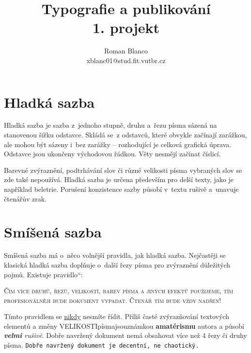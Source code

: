 \documentclass[11pt,a4paper,twocolumn]{article}
\newcommand{\myuv}[1]{\quotedblbase #1\textquotedblleft}
\newenvironment{centerblock}[1][\textwidth]
{
   \begin{center}
   \begin{minipage}[t]{#1}
   \raggedright
}{
   \end{minipage}
   \end{center}
}
\begin{document}
   \title{
       Typografie a publikování \\[1mm]
       1. projekt \\[2mm]}
   \author{
       Roman Blanco \\[0.5mm]
       xblanc01@stud.fit.vutbr.cz}
   \date{}

   \maketitle

   \section{Hladká sazba}

      Hladká sazba je sazba z~jednoho stupně, druhu a~řezu písma sázená na stanovenou šířku odstavce. Skládá se~z odstavců, které obvykle začínají za\-ráž\-kou, ale mohou být sázeny i~bez zarážky -- rozhodující je celková grafická úprava. Odstavce jsou ukončeny východovou řádkou. Věty nesmějí začínat číslicí. 

      Barevné zvýraznění, podtrhávání slov či různé velikosti písma vybraných slov se zde také ne\-po\-u\-ží\-vá. Hladká sazba je určena především pro delší texty, jako je například beletrie. Porušení konzistence sazby působí v~textu rušivě a~unavuje čtenářův zrak.

   \section{Smíšená sazba}

      Smíšená sazba má o~něco volnější pravidla, jak hladká sazba. Nejčastěji se klasická hladká saz\-ba doplňuje o~další řezy písma pro zvýraznění důležitých pojmů. Existuje \myuv{pravidlo}:

      \begin{centerblock}[6.5cm]
         \textsc{Čím více druhů, řezů, velikostí, barev písma a jiných efektů použijeme, tím profesionálněji bude dokument vypadat. Čtenář tím bude vždy nadšen!}
      \end{centerblock}

      Tímto pravidlem se \uline{nikdy} nesmíte řídit. Příliš časté zvýrazňování textových elementů a změny {\huge V}{\LARGE E}{\Large L}{\large I}{\normalsize K}{\small O}{\footnotesize S}{\scriptsize T}{\tiny I}\hfill{\large písma}\hfill{\Large jsou}\hfill{\LARGE známkou} \textbf{{\huge amatérismu}} autora a působí \textit{\textbf{velmi} rušivě}. Dobře navržený dokument nemá obsahovat více než 4 řezy či druhy písma. \texttt{Dobře navržený dokument je decentní, ne chaotický.}
\end{document}

